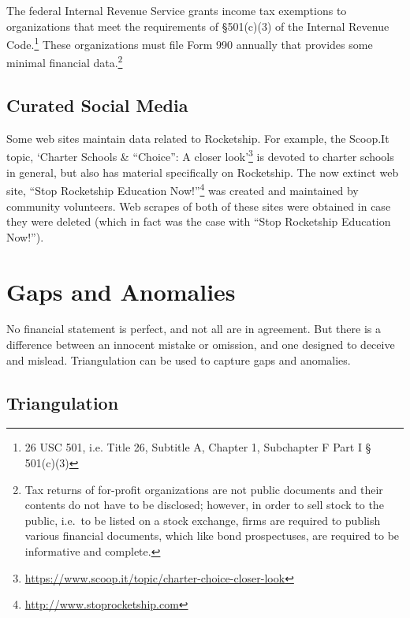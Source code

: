 The federal Internal Revenue Service grants income tax exemptions to organizations that meet the requirements of §501(c)(3) of the  Internal Revenue Code.\footnote{26 USC 501, i.e. Title 26, Subtitle A, Chapter 1, Subchapter F Part I § 501(c)(3)} These organizations must file Form 990 annually that provides some minimal financial data.\footnote{Tax returns of for-profit organizations are not public documents and their contents do not have to be disclosed; however, in order to sell stock to the public, i.e.~to be listed on a stock exchange, firms are required to publish various financial documents, which like bond prospectuses, are required to be informative and complete.} %

\subsection{Curated Social Media}\label{sec:curated-social-media}\indent%

Some web sites maintain data related to Rocketship. For example, the Scoop.It topic, `Charter Schools \& ``Choice'': A closer look'\footnote{\url{https://www.scoop.it/topic/charter-choice-closer-look}} is devoted to charter schools in general, but also has material specifically on Rocketship. The now extinct web site, ``Stop Rocketship Education Now!''\footnote{\url{http://www.stoprocketship.com}} was created and maintained by community volunteers. Web scrapes of both of these sites were obtained in case they were deleted (which in fact was the case with ``Stop Rocketship Education Now!'').

\section{Gaps and Anomalies}\label{sec:gaps-anomalies}\indent%

No financial statement is perfect, and not all are in agreement. But there is a difference between an innocent mistake or omission, and one designed to deceive and mislead. Triangulation can be used to capture gaps and anomalies.

\subsection{Triangulation}\label{sec:triangulation}\indent%

